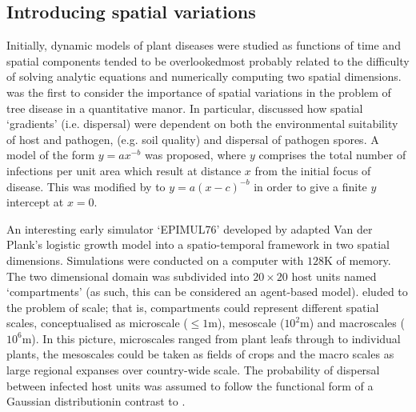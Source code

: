 \subsection{Introducing spatial variations}
Initially, dynamic models of plant diseases were studied as functions of time and spatial components tended to be overlooked\textemdash most probably related to the difficulty of solving analytic equations and numerically computing two spatial dimensions. \cite{doi:10.1146/annurev.py.06.090168.001201} was the first to consider the importance of spatial variations in the problem of tree disease in a quantitative manor. In particular, \cite{doi:10.1146/annurev.py.06.090168.001201} discussed how spatial `gradients' (i.e. dispersal) were dependent on both the environmental suitability of host and pathogen, (e.g. soil quality) and dispersal of pathogen spores. A model of the form $y=ax^{-b}$ was proposed, where $y$ comprises the total number of infections per unit area which result at distance $x$ from the initial focus of disease. This was modified by \cite{mundt1985modification} to $y=a(x-c)^{-b}$ in order to give a finite $y$ intercept at $x=0$.

An interesting early simulator `EPIMUL76' developed by \cite{zadoks1977role} adapted Van der Plank's logistic growth model into a spatio-temporal framework in two spatial dimensions. Simulations were conducted on a computer with $128\mathrm{K}$ of memory. The two dimensional domain was subdivided into $20\times 20$ host units named `compartments' (as such, this can be considered an agent-based model). \cite{zadoks1977role} eluded to the problem of scale; that is, compartments could represent different spatial scales, conceptualised as microscale ($\leq 1\mathrm{m}$), mesoscale ($10^2\mathrm{m}$) and macroscales ($10^6\mathrm{m}$). In this picture, microscales ranged from plant leafs through to individual plants, the mesoscales could be taken as fields of crops and the macro scales as large regional expanses over country-wide scale. The probability of dispersal between infected host units was assumed to follow the functional form of a Gaussian distribution\textemdash in contrast to \cite{doi:10.1146/annurev.py.06.090168.001201}.

